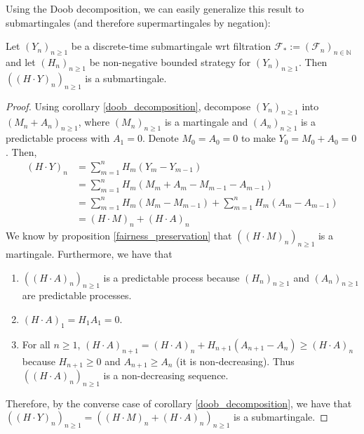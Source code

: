 Using the Doob decomposition, we can easily generalize this result to submartingales (and therefore supermartingales by negation):

\begin{corollary}
    Let $(Y_{n})_{n \geq 1}$ be a discrete-time submartingale wrt filtration $\mathcal{F}_{*} := (\mathcal{F}_{n})_{n \in \mathbb{N}}$ and let \((H_{n})_{n \geq 1}\) be non-negative bounded strategy for \((Y_{n})_{n \geq 1}\). Then \(((H \cdot Y)_{n})_{n \geq 1}\) is a submartingale.
\end{corollary}
    
\begin{proof}
    Using corollary \ref{doob_decomposition}, decompose \((Y_{n})_{n \geq 1}\) into \((M_{n} + A_{n})_{n \geq 1}\), where \((M_{n})_{n \geq 1}\) is a martingale and \((A_{n})_{n \geq 1}\) is a predictable process with \(A_{1} = 0\). Denote \(M_{0} = A_{0} = 0\) to make \(Y_{0} = M_{0} + A_{0} = 0\). Then,
    \begin{align*}
        (H \cdot Y)_{n} &= \sum\limits_{m=1}^{n}H_{m}(Y_{m} - Y_{m-1}) \\
        &= \sum\limits_{m=1}^{n}H_{m}(M_{m} + A_{m} - M_{m-1} - A_{m-1}) \\
        &= \sum\limits_{m=1}^{n}H_{m}(M_{m} - M_{m-1}) + \sum\limits_{m=1}^{n}H_{m}( A_{m}  - A_{m-1}) \\
        &= (H \cdot M)_{n} + (H \cdot A)_{n}
    \end{align*}
    We know by proposition \ref{fairness_preservation} that \(((H \cdot M)_{n})_{n \geq 1}\) is a martingale. Furthermore, we have that 
    \begin{enumerate}
        \item \(((H \cdot A)_{n})_{n \geq 1}\) is a predictable process because  \((H_{n})_{n \geq 1}\) and \((A_{n})_{n \geq 1}\) are predictable processes.
        \item \((H \cdot A)_{1} = H_{1} A_{1} = 0\).
        \item For all \(n \geq 1\), \((H \cdot A)_{n+1} = (H \cdot A)_{n} + H_{n+1} (A_{n+1} - A_{n}) \geq (H \cdot A)_{n}\) because \(H_{n+1} \geq 0\) and \(A_{n+1} \geq A_{n}\) (it is non-decreasing). Thus \(((H \cdot A)_{n})_{n \geq 1}\) is a non-decreasing sequence. 
    \end{enumerate}

    Therefore, by the converse case of corollary \ref{doob_decomposition}, we have that  \(((H \cdot Y)_{n})_{n \geq 1} = ( (H \cdot M)_{n} + (H \cdot A)_{n})_{n \geq 1}\) is a submartingale.
\end{proof}

